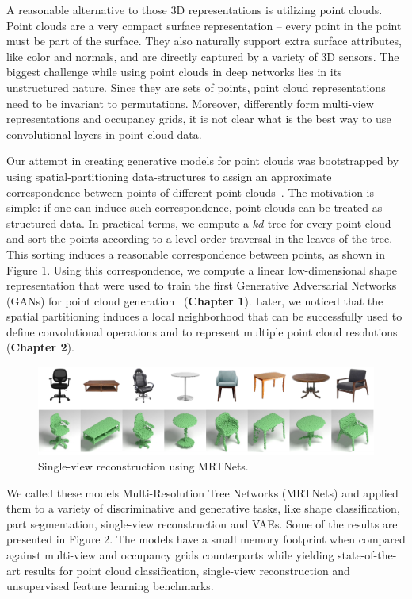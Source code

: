 A reasonable alternative to those 3D representations is utilizing point clouds.
Point clouds are a very compact surface representation -- every point in the point must be part of the surface.
They also naturally support extra surface attributes, like color and normals, and are directly captured by a variety of 3D sensors.
The biggest challenge while using point clouds in deep networks lies in its unstructured nature.
Since they are sets of points, point cloud representations need to be invariant to permutations.
Moreover, differently form multi-view representations and occupancy grids, it is not clear what is the best way to use convolutional layers in point cloud data.

Our attempt in creating generative models for point clouds was bootstrapped by using spatial-partitioning data-structures to assign an approximate correspondence between points of
different point clouds~\cite{pcagan}.
The motivation is simple: if one can induce such correspondence, point clouds can be treated as structured data.
In practical terms, we compute a $kd$-tree for every point cloud and sort the points according to a level-order traversal in the leaves of the tree.
This sorting induces a reasonable correspondence between points, as shown in Figure 1.
Using this correspondence, we compute a linear low-dimensional shape representation that were used to
train the first Generative Adversarial Networks (GANs) for point cloud generation~\cite{pcagan} (\textbf{Chapter 1}).
Later, we noticed that the spatial partitioning induces a local neighborhood that can be successfully
used to define convolutional operations and to represent multiple point cloud resolutions~\cite{mrt} (\textbf{Chapter 2}).
\begin{figure}
\vspace{-20pt}
 \begin{center}
 \includegraphics[width=0.7\linewidth]{figs/mrtresults.png}
 \end{center}
 \vspace{-20pt}
 \caption{\small Single-view reconstruction using MRTNets.}
 \vspace{-5pt}
\end{figure}
We called these models Multi-Resolution Tree Networks (MRTNets) and applied them to a variety of
discriminative and generative tasks, like shape classification, 
part segmentation, single-view reconstruction and VAEs.
Some of the results are presented in Figure 2.
The models have a small memory footprint when compared against multi-view and occupancy grids counterparts while yielding state-of-the-art results for point cloud classification, single-view reconstruction and
unsupervised feature learning benchmarks.


